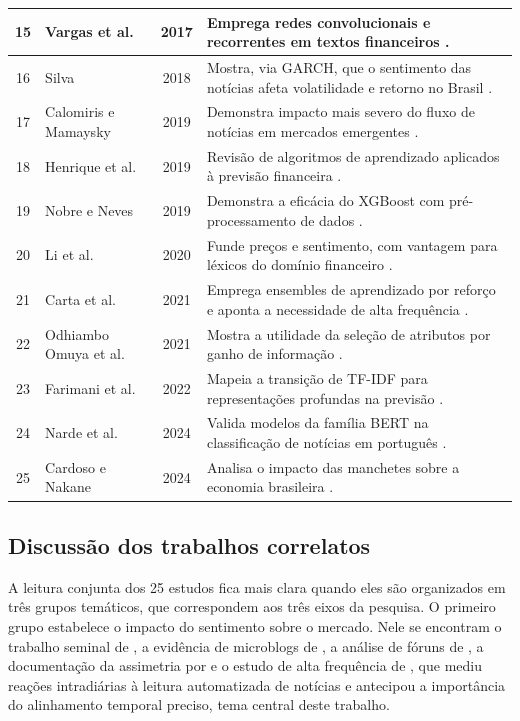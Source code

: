 {\begin{longtable}{c p{3.6cm} c p{7.4cm}}
15 & Vargas et al. & 2017 & Emprega redes convolucionais e recorrentes em textos financeiros \cite{vargas_deep_2017}. \\ \hline
16 & Silva & 2018 & Mostra, via GARCH, que o sentimento das notícias afeta volatilidade e retorno no Brasil \cite{silva_o_2018}. \\ \hline
17 & Calomiris e Mamaysky & 2019 & Demonstra impacto mais severo do fluxo de notícias em mercados emergentes \cite{calomiris_how_2019}. \\ \hline
18 & Henrique et al. & 2019 & Revisão de algoritmos de aprendizado aplicados à previsão financeira \cite{henrique_literature_2019}. \\ \hline
19 & Nobre e Neves & 2019 & Demonstra a eficácia do XGBoost com pré-processamento de dados \cite{nobre_combining_2019}. \\ \hline
20 & Li et al. & 2020 & Funde preços e sentimento, com vantagem para léxicos do domínio financeiro \cite{li_incorporating_2020}. \\ \hline
21 & Carta et al. & 2021 & Emprega ensembles de aprendizado por reforço e aponta a necessidade de alta frequência \cite{carta_multi-dqn_2021}. \\ \hline
22 & Odhiambo Omuya et al. & 2021 & Mostra a utilidade da seleção de atributos por ganho de informação \cite{odhiambo_omuya_feature_2021}. \\ \hline
23 & Farimani et al. & 2022 & Mapeia a transição de TF-IDF para representações profundas na previsão \cite{farimani_text_2022}. \\ \hline
24 & Narde et al. & 2024 & Valida modelos da família BERT na classificação de notícias em português \cite{narde_classificacao_nodate}. \\ \hline
25 & Cardoso e Nakane & 2024 & Analisa o impacto das manchetes sobre a economia brasileira \cite{cardoso_whats_nodate}. \\ \hline
\end{longtable}
}

\subsection{Discussão dos trabalhos correlatos}
A leitura conjunta dos 25 estudos fica mais clara quando eles são organizados em três grupos temáticos, que correspondem aos três eixos da pesquisa. O primeiro grupo estabelece o impacto do sentimento sobre o mercado. Nele se encontram o trabalho seminal de , a evidência de microblogs de , a análise de fóruns de , a documentação da assimetria por  e o estudo de alta frequência de , que mediu reações intradiárias à leitura automatizada de notícias e antecipou a importância do alinhamento temporal preciso, tema central deste trabalho.

